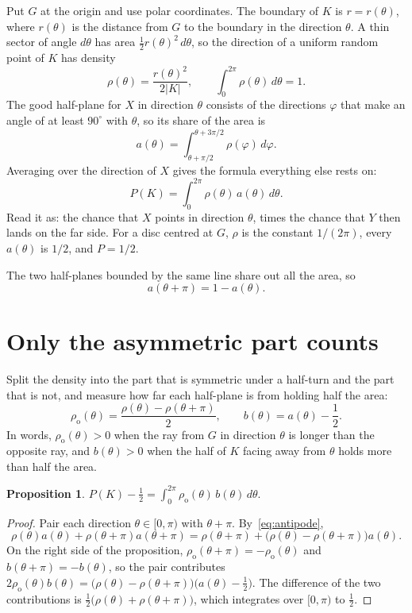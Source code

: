 \documentclass[11pt]{article}
\newtheorem{proposition}{Proposition}
\theoremstyle{remark}
\newcommand{\ro}{\rho_{\mathrm o}}
\newcommand{\abs}[1]{\left|#1\right|}
\begin{document}
Put $G$ at the origin and use polar coordinates. The boundary of $K$ is $r=r(\theta)$, where $r(\theta)$ is
the distance from $G$ to the boundary in the direction $\theta$. A thin sector of angle $d\theta$ has area
$\tfrac12 r(\theta)^2\,d\theta$, so the direction of a uniform random point of $K$ has density
\[
\rho(\theta)=\frac{r(\theta)^2}{2\abs{K}},\qquad \int_0^{2\pi}\rho(\theta)\,d\theta=1 .
\]
The good half-plane for $X$ in direction $\theta$ consists of the directions $\varphi$ that make an angle of
at least $90^\circ$ with $\theta$, so its share of the area is
\[
a(\theta)=\int_{\theta+\pi/2}^{\theta+3\pi/2}\rho(\varphi)\,d\varphi .
\]
Averaging over the direction of $X$ gives the formula everything else rests on:
\begin{equation}\label{eq:P}
P(K)=\int_0^{2\pi}\rho(\theta)\,a(\theta)\,d\theta .
\end{equation}
Read it as: the chance that $X$ points in direction $\theta$, times the chance that $Y$ then lands on the
far side. For a disc centred at $G$, $\rho$ is the constant $1/(2\pi)$, every $a(\theta)$ is $1/2$, and
$P=1/2$.

The two half-planes bounded by the same line share out all the area, so
\begin{equation}\label{eq:antipode}
a(\theta+\pi)=1-a(\theta).
\end{equation}

\section{Only the asymmetric part counts}\label{sec:odd}

Split the density into the part that is symmetric under a half-turn and the part that is not, and
measure how far each half-plane is from holding half the area:
\[
\ro(\theta)=\frac{\rho(\theta)-\rho(\theta+\pi)}{2},\qquad b(\theta)=a(\theta)-\frac12 .
\]
In words, $\ro(\theta)>0$ when the ray from $G$ in direction $\theta$ is longer than the opposite ray, and
$b(\theta)>0$ when the half of $K$ facing away from $\theta$ holds more than half the area.

\begin{proposition}\label{prop:key}
$\displaystyle P(K)-\frac12=\int_0^{2\pi}\ro(\theta)\,b(\theta)\,d\theta .$
\end{proposition}

\begin{proof}
Pair each direction $\theta\in[0,\pi)$ with $\theta+\pi$. By~\eqref{eq:antipode},
\[
\rho(\theta)a(\theta)+\rho(\theta+\pi)a(\theta+\pi)=\rho(\theta+\pi)+\bigl(\rho(\theta)-\rho(\theta+\pi)\bigr)a(\theta).
\]
On the right side of the proposition, $\ro(\theta+\pi)=-\ro(\theta)$ and $b(\theta+\pi)=-b(\theta)$, so
the pair contributes $2\ro(\theta)b(\theta)=\bigl(\rho(\theta)-\rho(\theta+\pi)\bigr)\bigl(a(\theta)-\tfrac12\bigr)$.
The difference of the two contributions is $\tfrac12\bigl(\rho(\theta)+\rho(\theta+\pi)\bigr)$, which
integrates over $[0,\pi)$ to $\tfrac12$.
\end{proof}
\end{document}
